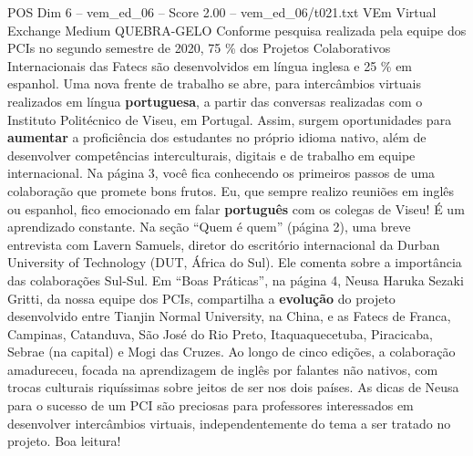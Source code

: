 \begin{textsample}{POS Dim 6 – vem\_ed\_06 – Score 2.00 – vem\_ed\_06/t021.txt}  \label{ex:f6_pos_076}
VEm Virtual Exchange Medium QUEBRA-GELO Conforme pesquisa realizada pela equipe dos PCIs no segundo semestre de 2020, 75 \% dos Projetos Colaborativos Internacionais das Fatecs são desenvolvidos em língua inglesa e 25 \% em espanhol.
Uma nova frente de trabalho se abre, para intercâmbios virtuais realizados em língua \textbf{portuguesa}, a partir das conversas realizadas com o Instituto Politécnico de Viseu, em Portugal.
Assim, surgem oportunidades para \textbf{aumentar} a proficiência dos estudantes no próprio idioma nativo, além de desenvolver competências interculturais, digitais e de trabalho em equipe internacional.
Na página 3, você fica conhecendo os primeiros passos de uma colaboração que promete bons frutos.
Eu, que sempre realizo reuniões em inglês ou espanhol, fico emocionado em falar \textbf{português} com os colegas de Viseu!
É um aprendizado constante.
Na seção “Quem é quem” (página 2), uma breve entrevista com Lavern Samuels, diretor do escritório internacional da Durban University of Technology (DUT, África do Sul).
Ele comenta sobre a importância das colaborações Sul-Sul.
Em “Boas Práticas”, na página 4, Neusa Haruka Sezaki Gritti, da nossa equipe dos PCIs, compartilha a \textbf{evolução} do projeto desenvolvido entre Tianjin Normal University, na China, e as Fatecs de Franca, Campinas, Catanduva, São José do Rio Preto, Itaquaquecetuba, Piracicaba, Sebrae (na capital) e Mogi das Cruzes.
Ao longo de cinco edições, a colaboração amadureceu, focada na aprendizagem de inglês por falantes não nativos, com trocas culturais riquíssimas sobre jeitos de ser nos dois países.
As dicas de Neusa para o sucesso de um PCI são preciosas para professores interessados em desenvolver intercâmbios virtuais, independentemente do tema a ser tratado no projeto.
Boa leitura!

\end{textsample}
